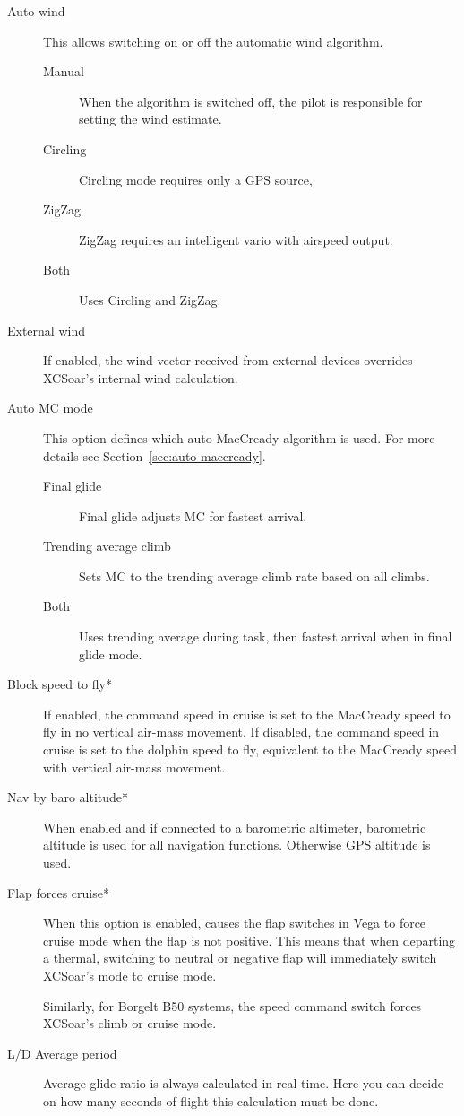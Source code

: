 \begin{description}
\item[Auto wind]  \label{conf:autowind} This allows switching on or off the
automatic wind algorithm.
 \begin{description}
\item[Manual]  When the algorithm is switched off, the pilot is responsible for
  setting the wind estimate.
\item[Circling]  Circling mode requires only a GPS source, 
\item[ZigZag]  ZigZag requires an intelligent vario with airspeed output.
\item[Both]  Uses Circling and ZigZag.
\end{description}

\item[External wind]  If enabled, the wind vector received from external
devices overrides XCSoar's internal wind calculation.

\item[Auto MC mode] This option defines which auto MacCready algorithm is used.
For more details see Section~\ref{sec:auto-maccready}.
 \begin{description}
\item[Final glide] Final glide adjusts MC for fastest arrival.
\item[Trending average climb]  Sets MC to the trending average climb rate
based on all climbs.
\item[Both] Uses trending average during task, then fastest arrival when in
final glide mode.
\end{description}

\item[Block speed to fly*] If enabled, the command speed in cruise
  is set to the MacCready speed to fly in no vertical air-mass movement.
  If disabled, the command speed in cruise is set to the dolphin speed to fly,
  equivalent to the MacCready speed with vertical air-mass movement.

\item[Nav by baro altitude*] When enabled and if connected to a barometric
  altimeter, barometric altitude is used for all navigation functions. Otherwise
  GPS altitude is used.

\item[Flap forces cruise*]
  When this option is enabled, causes the flap switches in Vega to
  force cruise mode when the flap is not positive.  This means that
  when departing a thermal, switching to neutral or negative flap will
  immediately switch XCSoar's mode to cruise mode.

  Similarly, for Borgelt B50 systems, the speed command switch forces
  XCSoar's climb or cruise mode.

\item[L/D Average period] Average glide ratio is always calculated in real time. Here you can decide 
on how many seconds of flight this calculation must be done.
\end{description}

